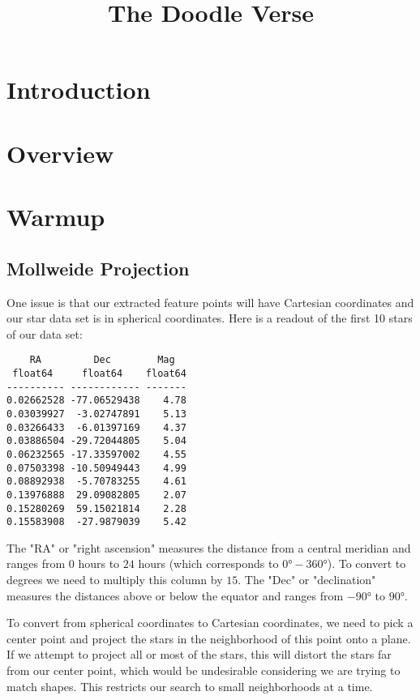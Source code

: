 \documentclass[paper=a4, fontsize=11pt]{scrartcl} %
\title{
\normalfont \normalsize
\huge The Doodle Verse \\ %
}
\date{}
\begin{document}
\maketitle

\section{Introduction}

\section{Overview}

\section{Warmup}

\subsection{Mollweide Projection}
One issue is that our extracted feature points will have Cartesian coordinates and our star data set is in spherical coordinates. Here is a readout of the first 10 stars of our data set:
\begin{lstlisting}
    RA         Dec        Mag  
 float64     float64    float64
---------- ------------ -------
0.02662528 -77.06529438    4.78
0.03039927  -3.02747891    5.13
0.03266433  -6.01397169    4.37
0.03886504 -29.72044805    5.04
0.06232565 -17.33597002    4.55
0.07503398 -10.50949443    4.99
0.08892938  -5.70783255    4.61
0.13976888  29.09082805    2.07
0.15280269  59.15021814    2.28
0.15583908  -27.9879039    5.42
\end{lstlisting}
The "RA" or "right ascension" measures the distance from a central meridian and ranges from $0$ hours to $24$ hours (which corresponds to $0\si{\degree}-360\si{\degree}$). To convert to degrees we need to multiply this column by $15$.
The "Dec" or "declination" measures the distances above or below the equator and ranges from $-90\si{\degree}$ to $90\si{\degree}$.

To convert from spherical coordinates to Cartesian coordinates, we need to pick a center point and project the stars in the neighborhood of this point onto a plane.  If we attempt to project all or most of the stars, this will distort the stars far from our center point, which would be undesirable considering we are trying to match shapes.  This restricts our search to small neighborhoods at a time.
\end{document}
